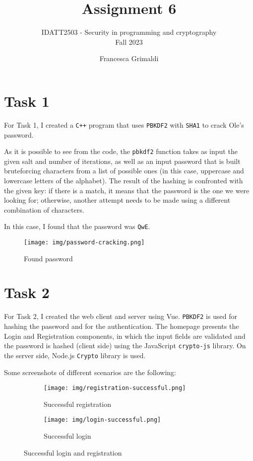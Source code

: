 \documentclass{article}
\title{%
    \huge Assignment 6}
\subtitle{%
    IDATT2503 - Security in programming and cryptography \\
    Fall 2023
    }
\author{%
  Francesca Grimaldi
}
\date{}
\begin{document}
\maketitle


\section{Task 1}
For Task 1, I created a \texttt{C++} program that uses \texttt{PBKDF2} with \texttt{SHA1} to crack Ole's password.

As it is possible to see from the code, the \texttt{pbkdf2} function takes as input the given salt and number of iterations, as well as an input password that is built bruteforcing characters from a list of possible ones (in this case, uppercase and lowercase letters of the alphabet).
The result of the hashing is confronted with the given key: if there is a match, it means that the password is the one we were looking for; otherwise, another attempt needs to be made using a different combination of characters.

In this case, I found that the password was \texttt{QwE}.

\begin{figure}[H]
    \centering
    \texttt{[image: img/password-cracking.png]}
    \caption{Found password}
    \label{fig:password-cracking}
\end{figure}

\section{Task 2}
For Task 2, I created the web client and server using Vue.
\texttt{PBKDF2} is used for hashing the password and for the authentication.
The homepage presents the Login and Registration components, in which the input fields are validated and the password is hashed (client side) using the JavaScript \texttt{crypto-js} library.
On the server side, Node.js \texttt{Crypto} library is used.

Some screenshots of different scenarios are the following:
\begin{figure}[H]
\centering
\begin{subfigure}[b]{0.45 \textwidth}
    \texttt{[image: img/registration-successful.png]}
    \caption{Successful registration}
    \label{fig:registration-successful}
\end{subfigure}
\hfill
\begin{subfigure}{0.45 \textwidth}
    \texttt{[image: img/login-successful.png]}
    \caption{Successful login}
    \label{fig:login-successful}
\end{subfigure}
\caption{Successful login and registration}
\label{fig:success}
\end{figure}
\end{document}

